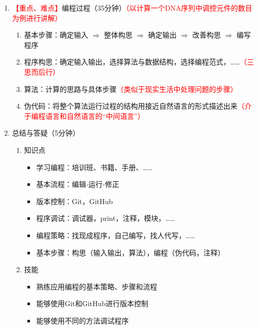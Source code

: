 \documentclass{TIJMUjiaoanLL}
\begin{document}
\begin{enumerate}
  \item \textcolor{red}{【重点、难点】}编程过程（35分钟）\textcolor{red}{（以计算一个DNA序列中调控元件的数目为例进行讲解）}
    \begin{enumerate}
      \item 基本步骤：确定输入 $\Rightarrow$ 整体构思 $\Rightarrow$ 确定输出 $\Rightarrow$ 改善构思 $\Rightarrow$ 编写程序
      \item 程序构思：确定输入输出，选择算法与数据结构，选择编程范式，……\textcolor{red}{（三思而后行）}
      \item 算法：计算的思路与具体步骤\textcolor{red}{（类似于现实生活中处理问题的步骤）}
      \item 伪代码：将整个算法运行过程的结构用接近自然语言的形式描述出来\textcolor{red}{（介于编程语言和自然语言的“中间语言”）}
\vspace*{-1em}
\vspace*{-1em}
    \end{enumerate}
  \item 总结与答疑（5分钟）
    \begin{enumerate}
      \item 知识点
	\begin{itemize}
	  \item 学习编程：培训班、书籍、手册、……
	  \item 基本流程：编辑-运行-修正
	  \item 版本控制：Git，GitHub
	  \item 程序调试：调试器，print，注释，模块，……
	  \item 编程策略：找现成程序，自己编写，找人代写，……
	  \item 基本步骤：构思（输入输出，算法），编程（伪代码，注释）
	\end{itemize}
      \item 技能
	\begin{itemize}
	  \item 熟练应用编程的基本策略、步骤和流程
	  \item 能够使用Git和GitHub进行版本控制
	  \item 能够使用不同的方法调试程序
	\end{itemize}
    \end{enumerate}
\end{enumerate}

\otherTail
\end{document}
